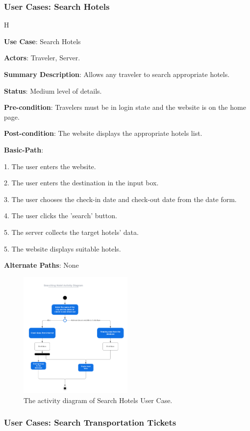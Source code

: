 \documentclass[conference]{IEEEtran}
\begin{document}
\subsubsection{User Cases: Search Hotels}
H
\textbf{ }

\textbf{Use Case}: Search Hotels

\textbf{Actors}: Traveler, Server.

\textbf{Summary Description}: Allows any traveler to search appropriate hotels.

\textbf{Status}: Medium level of details.

\textbf{Pre-condition}: Travelers must be in login state and the website is on the home page.

\textbf{Post-condition}: The website displays the appropriate hotels list.

\textbf{Basic-Path}:

1. The user enters the website.

2. The user enters the destination in the input box.

3. The user chooses the check-in date and check-out date from the date form.

4. The user clicks the 'search' button.

5. The server collects the target hotels' data.

5. The website displays suitable hotels.

\textbf{Alternate Paths}: None

\begin{figure}[htbp]
	\centerline{\includegraphics[width=0.5\textwidth]{Searching_Hotel_Activity_Diagram_2.pdf}}
	\caption{The activity diagram of Search Hotels User Case.}
	\label{fig4}
\end{figure}

\subsubsection{User Cases: Search Transportation Tickets}
\end{document}
